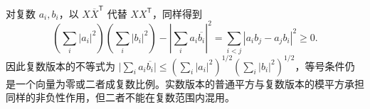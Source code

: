 对复数 $a_i,b_i$，以 $X\overline X^{\mathsf T}$ 代替 $XX^{\mathsf T}$，同样得到
\[
    \left(\sum_i|a_i|^2\right)\left(\sum_i|b_i|^2\right)
      -\left|\sum_i a_i\overline{b_i}\right|^2
    =\sum_{i<j}|a_ib_j-a_jb_i|^2\geq0.
\]
因此复数版本的不等式为 $\bigl|\sum_i a_i\overline{b_i}\bigr|\leq(\sum_i|a_i|^2)^{1/2}(\sum_i|b_i|^2)^{1/2}$，等号条件仍是一个向量为零或二者成复数比例。实数版本的普通平方与复数版本的模平方承担同样的非负性作用，但二者不能在复数范围内混用。








